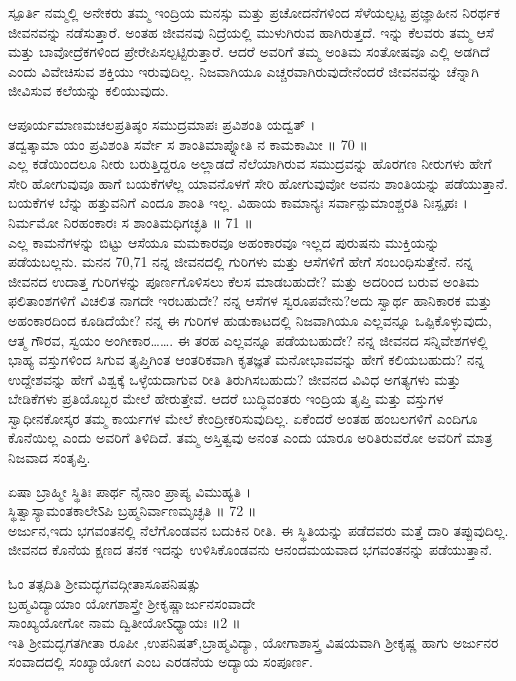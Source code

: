  ಸ್ಪೂರ್ತಿ 
 ನಮ್ಮಲ್ಲಿ ಅನೇಕರು ತಮ್ಮ ಇಂದ್ರಿಯ ಮನಸ್ಸು ಮತ್ತು ಪ್ರಚೋದನೆಗಳಿಂದ ಸೆಳೆಯಲ್ಪಟ್ಟ ಪ್ರಜ್ಞಾಹೀನ ನಿರರ್ಥಕ   ಜೀವನವನ್ನು ನಡೆಸುತ್ತಾರೆ. ಅಂತಹ ಜೀವನವು ನಿದ್ರೆಯಲ್ಲಿ  ಮುಳುಗಿರುವ ಹಾಗಿರುತ್ತದೆ. ಇನ್ನು ಕೆಲವರು ತಮ್ಮ ಆಸೆ ಮತ್ತು ಬಾವೋದ್ರೆಕಗಳಿಂದ ಪ್ರೇರೇಪಿಸಲ್ಪಟ್ಟಿರುತ್ತಾರೆ. ಆದರೆ ಅವರಿಗೆ ತಮ್ಮ ಅಂತಿಮ ಸಂತೋಷವೂ ಎಲ್ಲಿ ಅಡಗಿದೆ ಎಂದು ವಿವೇಚಿಸುವ ಶಕ್ತಿಯು ಇರುವುದಿಲ್ಲ. ನಿಜವಾಗಿಯೂ ಎಚ್ಚರವಾಗಿರುವುದೇನೆಂದರೆ ಜೀವನವನ್ನು ಚೆನ್ನಾಗಿ ಜೀವಿಸುವ ಕಲೆಯನ್ನು ಕಲಿಯುವುದು.
 
ಆಪೂರ್ಯಮಾಣಮಚಲಪ್ರತಿಷ್ಠಂ ಸಮುದ್ರಮಾಪಃ ಪ್ರವಿಶಂತಿ ಯದ್ವತ್ ।\\
ತದ್ವತ್ಕಾಮಾ ಯಂ ಪ್ರವಿಶಂತಿ ಸರ್ವೇ ಸ ಶಾಂತಿಮಾಪ್ನೋತಿ ನ ಕಾಮಕಾಮೀ ॥ 70 ॥\\
 ಎಲ್ಲ ಕಡೆಯಿಂದಲೂ ನೀರು ಬರುತ್ತಿದ್ದರೂ ಅಲ್ಲಾಡದೆ ನೆಲೆಯಾಗಿರುವ ಸಮುದ್ರವನ್ನು ಹೊರಗಣ ನೀರುಗಳು ಹೇಗೆ ಸೇರಿ ಹೋಗುವುವೂ ಹಾಗೆ ಬಯಕೆಗಳೆಲ್ಲ ಯಾವನೊಳಗೆ ಸೇರಿ ಹೋಗುವುವೋ ಅವನು ಶಾಂತಿಯನ್ನು ಪಡೆಯುತ್ತಾನೆ. ಬಯಕೆಗಳ ಬೆನ್ನು ಹತ್ತುವನಿಗೆ ಎಂದೂ ಶಾಂತಿ ಇಲ್ಲ.
ವಿಹಾಯ ಕಾಮಾನ್ಯಃ ಸರ್ವಾನ್ಪುಮಾಂಶ್ಚರತಿ ನಿಃಸ್ಪೃಹಃ ।\\
ನಿರ್ಮಮೋ ನಿರಹಂಕಾರಃ ಸ ಶಾಂತಿಮಧಿಗಚ್ಛತಿ ॥ 71 ॥\\
 ಎಲ್ಲ ಕಾಮನೆಗಳನ್ನು ಬಿಟ್ಟು ಆಸೆಯೂ ಮಮಕಾರವೂ ಅಹಂಕಾರವೂ ಇಲ್ಲದ ಪುರುಷನು ಮುಕ್ತಿಯನ್ನು ಪಡೆಯಬಲ್ಲನು.
ಮನನ 70,71
 ನನ್ನ ಜೀವನದಲ್ಲಿ ಗುರಿಗಳು ಮತ್ತು ಆಸೆಗಳಿಗೆ ಹೇಗೆ ಸಂಬಂಧಿಸುತ್ತೇನೆ. ನನ್ನ ಜೀವನದ ಉದಾತ್ತ   ಗುರಿಗಳನ್ನು ಪೂರ್ಣಗೊಳಿಸಲು ಕೆಲಸ ಮಾಡಬಹುದೇ? ಮತ್ತು ಅದರಿಂದ ಬರುವ ಅಂತಿಮ ಫಲಿತಾಂಶಗಳಿಗೆ ವಿಚಲಿತ ನಾಗದೇ ಇರಬಹುದೇ? ನನ್ನ ಆಸೆಗಳ ಸ್ವರೂಪವೇನು?ಅದು ಸ್ವಾರ್ಥ ಹಾನಿಕಾರಕ ಮತ್ತು ಅಹಂಕಾರದಿಂದ ಕೂಡಿದೆಯೇ?
 ನನ್ನ ಈ ಗುರಿಗಳ ಹುಡುಕಾಟದಲ್ಲಿ ನಿಜವಾಗಿಯೂ ಎಲ್ಲವನ್ನೂ ಒಪ್ಪಿಕೊಳ್ಳುವುದು, ಆತ್ಮ ಗೌರವ, ಸ್ವಯಂ  ಅಂಗೀಕಾರ……. ಈ ತರಹ ಎಲ್ಲವನ್ನೂ ಪಡೆಯಬಹುದೇ? ನನ್ನ ಜೀವನದ ಸನ್ನಿವೇಶಗಳಲ್ಲಿ ಭಾಹ್ಯ ವಸ್ತುಗಳಿಂದ ಸಿಗುವ ತೃಪ್ತಿಗಿಂತ ಆಂತರಿಕವಾಗಿ ಕೃತಜ್ಞತೆ ಮನೋಭಾವವನ್ನು ಹೇಗೆ ಕಲಿಯಬಹುದು? ನನ್ನ ಉದ್ದೇಶವನ್ನು ಹೇಗೆ ವಿಶ್ವಕ್ಕೆ ಒಳ್ಳೆಯದಾಗುವ ರೀತಿ ತಿರುಗಿಸಬಹುದು?
 ಜೀವನದ ವಿವಿಧ ಅಗತ್ಯಗಳು ಮತ್ತು ಬೇಡಿಕೆಗಳು ಪ್ರತಿಯೊಬ್ಬರ ಮೇಲೆ ಹೇರುತ್ತೇವೆ. ಆದರೆ ಬುದ್ಧಿವಂತರು ಇಂದ್ರಿಯ ತೃಪ್ತಿ ಮತ್ತು ವಸ್ತುಗಳ ಸ್ವಾಧೀನಕೋಸ್ಕರ  ತಮ್ಮ ಕಾರ್ಯಗಳ ಮೇಲೆ ಕೇಂದ್ರೀಕರಿಸುವುದಿಲ್ಲ. ಏಕೆಂದರೆ ಅಂತಹ ಹಂಬಲಗಳಿಗೆ ಎಂದಿಗೂ ಕೊನೆಯಿಲ್ಲ ಎಂದು ಅವರಿಗೆ ತಿಳಿದಿದೆ.
 ತಮ್ಮ ಅಸ್ತಿತ್ವವು ಅನಂತ ಎಂದು ಯಾರೂ ಅರಿತಿರುವರೋ ಅವರಿಗೆ ಮಾತ್ರ ನಿಜವಾದ ಸಂತೃಪ್ತಿ.

ಏಷಾ ಬ್ರಾಹ್ಮೀ ಸ್ಥಿತಿಃ ಪಾರ್ಥ ನೈನಾಂ ಪ್ರಾಪ್ಯ ವಿಮುಹ್ಯತಿ ।\\
ಸ್ಥಿತ್ವಾಸ್ಯಾಮಂತಕಾಲೇऽಪಿ ಬ್ರಹ್ಮನಿರ್ವಾಣಮೃಚ್ಛತಿ ॥ 72 ॥\\
 ಅರ್ಜುನ,ಇದು ಭಗವಂತನಲ್ಲಿ ನೆಲೆಗೊಂಡವನ ಬದುಕಿನ ರೀತಿ. ಈ ಸ್ಥಿತಿಯನ್ನು ಪಡೆದವರು ಮತ್ತೆ ದಾರಿ ತಪ್ಪುವುದಿಲ್ಲ. ಜೀವನದ ಕೊನೆಯ ಕ್ಷಣದ ತನಕ ಇದನ್ನು ಉಳಿಸಿಕೊಂಡವನು ಆನಂದಮಯವಾದ ಭಗವಂತನನ್ನು ಪಡೆಯುತ್ತಾನೆ.\\
\begin{center}
{\tiny\color{brown}
ಓಂ ತತ್ಸದಿತಿ ಶ್ರೀಮದ್ಭಗವದ್ಗೀತಾಸೂಪನಿಷತ್ಸು \\
ಬ್ರಹ್ಮವಿದ್ಯಾಯಾಂ ಯೋಗಶಾಸ್ತ್ರೇ ಶ್ರೀಕೃಷ್ಣಾರ್ಜುನಸಂವಾದೇ\\
ಸಾಂಖ್ಯಯೋಗೋ ನಾಮ ದ್ವಿತೀಯೋऽಧ್ಯಾಯಃ ॥2 ॥\\
ಇತಿ ಶ್ರೀಮದ್ಭಗತಗೀತಾ ರೂಪೀ ,ಉಪನಿಷತ್,ಬ್ರಾಹ್ಮವಿದ್ಯಾ, ಯೋಗಾಶಾಸ್ತ್ರ ವಿಷಯವಾಗಿ ಶ್ರೀಕೃಷ್ಣ ಹಾಗು ಅರ್ಜುನರ ಸಂವಾದದಲ್ಲಿ ಸಂಖ್ಯಾಯೋಗ ಎಂಬ ಎರಡನೆಯ ಅದ್ಯಾಯ ಸಂಪೂರ್ಣ.}
\end{center}
